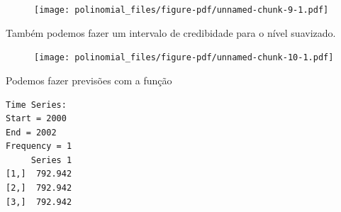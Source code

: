 \documentclass[
  letterpaper,
  DIV=11,
  numbers=noendperiod]{scrreprt}
\newenvironment{Shaded}{\begin{snugshade}}{\end{snugshade}}
\newcommand{\AttributeTok}[1]{\textcolor[rgb]{0.40,0.45,0.13}{#1}}
\newcommand{\CommentTok}[1]{\textcolor[rgb]{0.37,0.37,0.37}{#1}}
\newcommand{\DecValTok}[1]{\textcolor[rgb]{0.68,0.00,0.00}{#1}}
\newcommand{\FloatTok}[1]{\textcolor[rgb]{0.68,0.00,0.00}{#1}}
\newcommand{\FunctionTok}[1]{\textcolor[rgb]{0.28,0.35,0.67}{#1}}
\newcommand{\NormalTok}[1]{\textcolor[rgb]{0.00,0.23,0.31}{#1}}
\newcommand{\OtherTok}[1]{\textcolor[rgb]{0.00,0.23,0.31}{#1}}
\newcommand{\SpecialCharTok}[1]{\textcolor[rgb]{0.37,0.37,0.37}{#1}}
\newcommand{\StringTok}[1]{\textcolor[rgb]{0.13,0.47,0.30}{#1}}
\begin{document}
\begin{figure}[H]

{\centering \texttt{[image: polinomial\_files/figure-pdf/unnamed-chunk-9-1.pdf]}

}

\end{figure}

Também podemos fazer um intervalo de credibidade para o nível suavizado.

\begin{Shaded}
\end{Shaded}

\begin{figure}[H]

{\centering \texttt{[image: polinomial\_files/figure-pdf/unnamed-chunk-10-1.pdf]}

}

\end{figure}

Podemos fazer previsões com a função

\begin{Shaded}
\end{Shaded}

\begin{verbatim}
Time Series:
Start = 2000 
End = 2002 
Frequency = 1 
     Series 1
[1,]  792.942
[2,]  792.942
[3,]  792.942
\end{verbatim}
\end{document}
